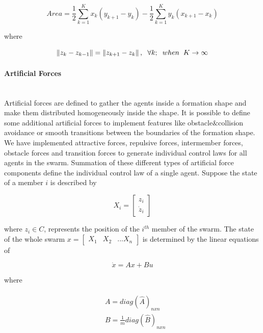 \begin{equation}
Area = \frac{1}{2} \sum_{k=1}^{K} x_k(y_{k+1} - y_k) - \frac{1}{2} \sum_{k=1}^{K}y_k(x_{k+1} - x_k)
\end{equation}
			
where

\begin{equation}
\left\lVert z_k - z_{k-1}\right\rVert = \left\lVert z_{k+1} - z_k\right\rVert, \hspace{0.2cm}  \forall k ;  \hspace{0.2cm} when  \hspace{0.2cm} K \to\infty
\end{equation}

\paragraph{Artificial Forces}\hspace{0pt} \\ 
Artificial forces are defined to gather the agents inside a formation shape and make them distributed homogeneously inside the shape. It is possible to define some additional artificial forces to implement features like obstacle$\&$collision avoidance or smooth transitions between the boundaries of the formation shape. We have implemented attractive forces, repulsive forces, intermember forces, obstacle forces and transition forces to generate individual control laws for all agents in the swarm. Summation of these different types of artificial force components define the individual control law of a single agent. Suppose the state of a member $i$ is described by

\begin{equation}
X_i = \begin{bmatrix}
z_i\\ \dot{z}_i
\end{bmatrix}
\end{equation}

where  $z_i \in C$, represents the position of the $i^{th}$ member of the swarm. The state of the whole swarm $x= \begin{bmatrix}
X_1 & X_2 & ... X_n
\end{bmatrix}$ is determined by the linear equations of \cite{17}

\begin{equation}
\dot{x} = Ax + Bu
\end{equation}

where

\begin{align}
\begin{split}
&A = diag\left(\hat{A}\right)_{nxn}\\
&B = \frac{1}{m} diag\left(\hat{B}\right)_{nxn}
\end{split}
\end{align}

